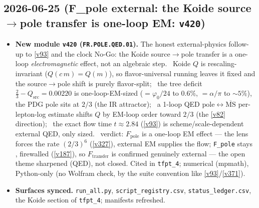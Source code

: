 \subsection*{2026-06-25 (F\_pole external: the Koide source$\to$pole transfer is one-loop EM: \texttt{v420})}
\begin{itemize}
\item \textbf{New module \texttt{v420} (\texttt{FR.POLE.QED.01}).} The honest external-physics follow-up to
\vref{v93} and the clock No-Go: the Koide source$\to$pole transfer is a one-loop \emph{electromagnetic}
effect, not an algebraic step. \mE\ Koide $Q$ is rescaling-invariant ($Q(c\,m)=Q(m)$), so flavor-universal
running leaves it fixed and the source$\to$pole shift is purely flavor-split; \mC\ the tree deficit
$\tfrac23-Q_{\mathrm{src}}=0.00220$ is one-loop-EM-sized ($=\varphi_0/24$ to $0.6\%$, $=\alpha/\pi$ to
${\sim}5\%$), the PDG pole sits at $2/3$ (the IR attractor); \mC\ a 1-loop QED
$\mathrm{pole}\!\leftrightarrow\!\overline{\mathrm{MS}}$ per-lepton-log estimate shifts $Q$ by EM-loop order
toward $2/3$ (the \vref{v82} direction); \mO\ the exact flow time $t\approx2.84$ (\vref{v93}) is
scheme/scale-dependent external QED, only sized. \mC\ verdict: $F_{\mathrm{pole}}$ is a one-loop EM effect
--- the lens forces the rate $(2/3)^6$ (\vref{v327}), external EM supplies the flow; \texttt{F\_pole} stays
\mC, firewalled (\vref{v187}), so $F_{\mathrm{transfer}}$ is confirmed genuinely external --- the open theme
sharpened (QED), not closed. Cited in \texttt{tfpt\_4}; numerical (mpmath), Python-only (no Wolfram check,
by the suite convention like \vref{v93}/\vref{v371}).
\item \textbf{Surfaces synced.} \texttt{run\_all.py}, \texttt{script\_registry.csv},
\texttt{status\_ledger.csv}, the Koide section of \texttt{tfpt\_4}; manifests refreshed.
\end{itemize}

